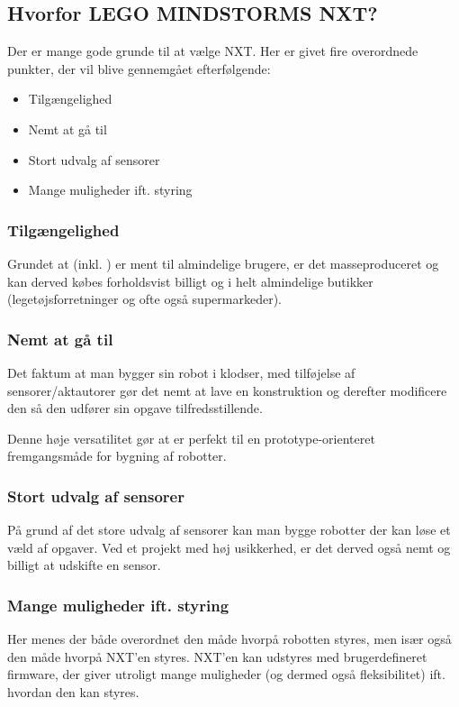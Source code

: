 \subsection{Hvorfor LEGO MINDSTORMS NXT?}
Der er mange gode grunde til at vælge \legoms NXT.
Her er givet fire overordnede punkter, der vil blive gennemgået efterfølgende:

\begin{itemize}
\item{Tilgængelighed}
\item{Nemt at gå til}
\item{Stort udvalg af sensorer}
\item{Mange muligheder ift. styring}
\end{itemize}

\subsubsection{Tilgængelighed}
Grundet at \lego (inkl. \legoms) er ment til almindelige brugere, er det masseproduceret og kan derved købes forholdsvist billigt og i helt almindelige butikker (legetøjsforretninger og ofte også supermarkeder).

\subsubsection{Nemt at gå til}
Det faktum at man bygger sin robot i \lego klodser, med tilføjelse af \legoms sensorer/aktautorer gør det nemt at lave en konstruktion og derefter modificere den så den udfører sin opgave tilfredsstillende.

Denne høje versatilitet gør at \lego er perfekt til en prototype-orienteret fremgangsmåde for bygning af robotter.

\subsubsection{Stort udvalg af sensorer}
På grund af det store udvalg af sensorer kan man bygge robotter der kan løse et væld af opgaver.
Ved et projekt med høj usikkerhed, er det derved også nemt og billigt at udskifte en sensor.

\subsubsection{Mange muligheder ift. styring}
Her menes der både overordnet den måde hvorpå robotten styres, men især også den måde hvorpå NXT'en styres.
NXT'en kan udstyres med brugerdefineret firmware, der giver utroligt mange muligheder (og dermed også fleksibilitet) ift. hvordan den kan styres.

